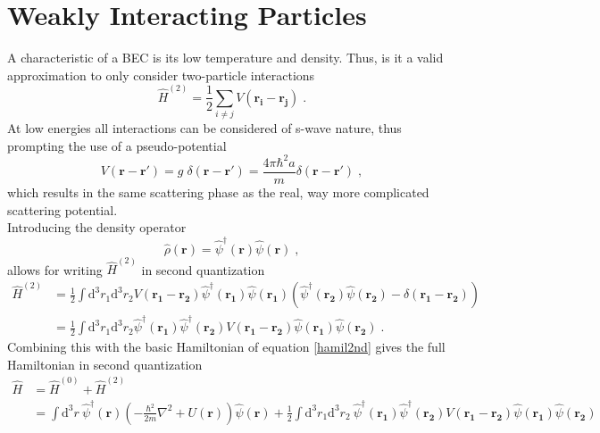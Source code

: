 \section{Weakly Interacting Particles}
A characteristic of a BEC is its low temperature and density. Thus, is it a valid approximation to only consider two-particle interactions
\begin{equation}
	\hat{H}^{(2)} = \frac{1}{2} \sum_{i \neq j} V(\boldsymbol{r_i} - \boldsymbol{r_j}) \; .
\end{equation}
At low energies all interactions can be considered of s-wave nature, thus prompting the use of a pseudo-potential
\begin{equation}
	V(\boldsymbol{r} - \boldsymbol{r'}) = g \; \delta(\boldsymbol{r} - \boldsymbol{r'}) = \frac{4 \pi \hbar^2 a}{m} \delta(\boldsymbol{r} - \boldsymbol{r'}) \; ,
\end{equation}
which results in the same scattering phase as the real, way more complicated scattering potential.\\
Introducing the density operator
\begin{equation}
	\hat{\rho}(\boldsymbol{r}) = \hat{\psi}^{\dag}(\boldsymbol{r}) \hat{\psi}(\boldsymbol{r}) \; ,
\end{equation}
allows for writing $\hat{H}^{(2)}$ in second quantization
\begin{align}
	\hat{H}^{(2)} &= \frac{1}{2} \int \mathrm{d^3}r_1 \mathrm{d^3}r_2 V(\boldsymbol{r_1} - \boldsymbol{r_2}) \hat{\psi}^{\dag}(\boldsymbol{r_1}) \hat{\psi}(\boldsymbol{r_1}) \left( \hat{\psi}^{\dag}(\boldsymbol{r_2}) \hat{\psi}(\boldsymbol{r_2}) - \delta(\boldsymbol{r_1} - \boldsymbol{r_2}) \right) \\
	&= \frac{1}{2} \int \mathrm{d^3}r_1 \mathrm{d^3}r_2  \hat{\psi}^{\dag}(\boldsymbol{r_1}) \hat{\psi}^{\dag}(\boldsymbol{r_2}) V(\boldsymbol{r_1} - \boldsymbol{r_2}) \hat{\psi}(\boldsymbol{r_1}) \hat{\psi}(\boldsymbol{r_2}) \; .
\end{align}
Combining this with the basic Hamiltonian of equation \ref{hamil2nd} gives the full Hamiltonian in second quantization
\begin{align}
	\hat{H} &= \hat{H}^{(0)} + \hat{H}^{(2)} \\
	& = \int \mathrm{d^3}r \ \hat{\psi}^{\dag}(\boldsymbol{r}) \left( - \frac{\hbar^2}{2 m} \nabla^2 + U(\boldsymbol{r})\right) \hat{\psi}(\boldsymbol{r}) + \frac{1}{2} \int \mathrm{d^3}r_1 \mathrm{d^3}r_2  \ \hat{\psi}^{\dag}(\boldsymbol{r_1}) \hat{\psi}^{\dag}(\boldsymbol{r_2}) V(\boldsymbol{r_1} - \boldsymbol{r_2}) \hat{\psi}(\boldsymbol{r_1}) \hat{\psi}(\boldsymbol{r_2})
	\label{hamilint}
\end{align}

